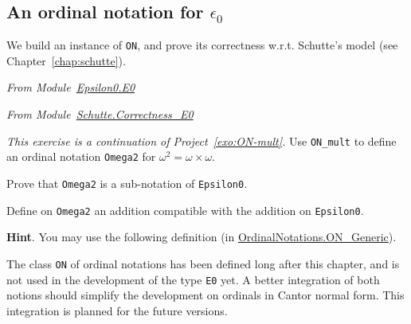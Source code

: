 \subsection{An ordinal notation for  \texorpdfstring{$\epsilon_0$}{epsilon0}}

We build an instance of \texttt{ON}, and prove its correctness w.r.t. Schutte's model (see Chapter~\ref{chap:schutte}).

\emph{From Module~\href{../theories/html/hydras.Epsilon0.E0.html}{Epsilon0.E0}}



\label{instance-epsilon0}

\emph{From Module~\href{../theories/html/hydras.Schutte.Correctness_E0.html}{Schutte.Correctness\_E0}}








\begin{project}
 \emph{This exercise is a continuation of Project~\vref{exo:ON-mult}.}
Use \texttt{ON\_mult} to define an ordinal notation \texttt{Omega2} for $\omega^2=\omega\times\omega$.

Prove that \texttt{Omega2} is a sub-notation of \texttt{Epsilon0}.

Define on \texttt{Omega2} an addition compatible with the addition on \texttt{Epsilon0}.

\textbf{Hint}. You may use the following definition (in 
    \href{../theories/html/hydras.OrdinalNotations.ON_Generic.html}{OrdinalNotations.ON\_Generic}).


    
     \end{project}

    \begin{project}
    The class \texttt{ON} of ordinal notations has been defined long after this 
    chapter, and is not used in the development of the type \texttt{E0} yet.
    A better integration of both notions should simplify the development on ordinals in Cantor normal form. This integration is planned for the future versions.

    \end{project}

 

